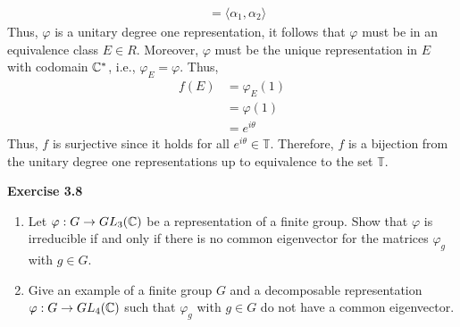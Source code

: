 \begin{solution}
\begin{align*}
        &= \langle \alpha_1, \alpha_2 \rangle
    \end{align*}
    Thus, $\varphi$ is a unitary degree one representation, it follows that $\varphi$ must be in an equivalence class $E \in R$. Moreover, $\varphi$ must be the unique representation in $E$ with codomain $\mathbb{C}^*$, i.e., $\varphi_E = \varphi$. Thus,
    \begin{align*}
        f(E) &= \varphi_E(1) \\
        &= \varphi(1) \\
        &= e^{i\theta}
    \end{align*}
    Thus, $f$ is surjective since it holds for all $e^{i \theta} \in \mathbb{T}$. Therefore, $f$ is a bijection from the unitary degree one representations up to equivalence to the set $\mathbb{T}$. \\
\end{solution}

\noindent \textbf{Exercise 3.8}
\begin{enumerate}
    \item Let $\varphi : G \to GL_3(\mathbb{C})$ be a representation of a finite group. Show that $\varphi$ is irreducible if and only if there is no common eigenvector for the matrices $\varphi_g$ with $g \in G$.
    \item Give an example of a finite group $G$ and a decomposable representation $\varphi : G \to GL_4(\mathbb{C})$ such that $\varphi_g$ with $g \in G$ do not have a common eigenvector. \\
\end{enumerate}

